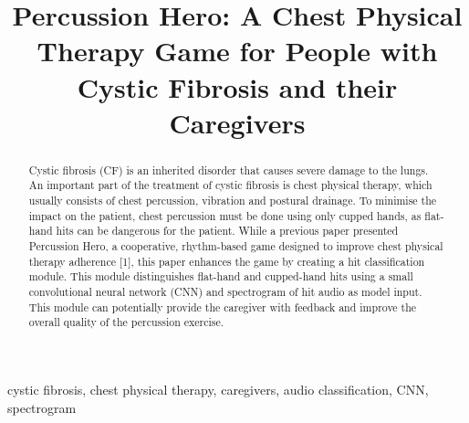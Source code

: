 \documentclass[conference]{IEEEtran}
\begin{document}
\title{Percussion Hero: A Chest Physical Therapy Game for People with Cystic Fibrosis and their Caregivers\\
}

\author{
\and
{}
\and
{}
}

\maketitle

\begin{abstract}
Cystic fibrosis (CF) is an inherited disorder that causes severe damage to the lungs. An important part of the treatment of cystic fibrosis is chest physical therapy, which usually consists of chest percussion, vibration and postural drainage. To minimise the impact on the patient, chest percussion must be done using only cupped hands, as flat-hand hits can be dangerous for the patient. While a previous paper presented Percussion Hero, a cooperative, rhythm-based game designed to improve chest physical therapy adherence [1], this paper enhances the game by creating a hit classification module. This module distinguishes flat-hand and cupped-hand hits using a small convolutional neural network (CNN) and spectrogram of hit audio as model input. This module can potentially provide the caregiver with feedback and improve the overall quality of the percussion exercise.
\end{abstract}

\begin{IEEEkeywords}
cystic fibrosis, chest physical therapy, caregivers, audio classification, CNN, spectrogram
\end{IEEEkeywords}
\end{document}
